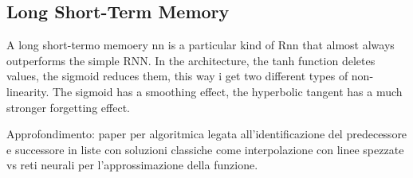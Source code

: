 \subsection*{Long Short-Term Memory}
A long short-termo memoery nn is a particular kind of Rnn that almost always outperforms the simple RNN. In the architecture, the tanh function deletes values, the sigmoid reduces them, this way i get two different types of non-linearity. The sigmoid has a smoothing effect, the hyperbolic tangent has a much stronger forgetting effect.


Approfondimento: paper per algoritmica legata all'identificazione del predecessore e successore in liste con soluzioni classiche come interpolazione con linee spezzate vs reti neurali per l'approssimazione della funzione. 

